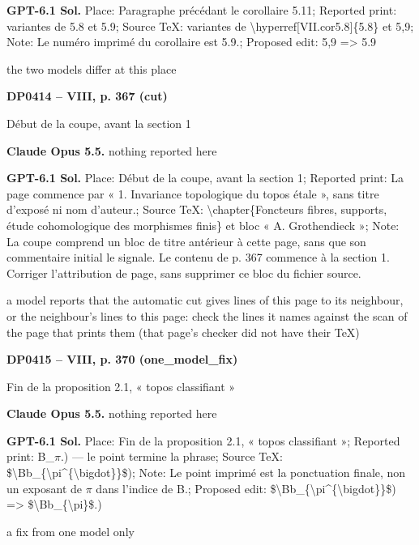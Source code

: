 \textbf{GPT-6.1 Sol.} Place: Paragraphe précédant le corollaire 5.11; Reported print: variantes de 5.8 et 5.9; Source TeX: variantes de \textbackslash{}hyperref[VII.cor5.8]\{5.8\} et 5,9; Note: Le numéro imprimé du corollaire est 5.9.; Proposed edit: 5,9 =\allowbreak > 5.9\par
the two models differ at this place\par
\par\noindent\hypertarget{DP0414}{}\textbf{DP0414 -- VIII, p. 367 (cut)}\par
Début de la coupe, avant la section 1\par
\textbf{Claude Opus 5.5.} nothing reported here\par
\textbf{GPT-6.1 Sol.} Place: Début de la coupe, avant la section 1; Reported print: La page commence par « 1. Invariance topologique du topos étale », sans titre d'exposé ni nom d'auteur.; Source TeX: \textbackslash{}chapter\{Foncteurs fibres, supports, étude cohomologique des morphismes finis\} et bloc « A. Grothendieck »; Note: La coupe comprend un bloc de titre antérieur à cette page, sans que son commentaire initial le signale. Le contenu de p. 367 commence à la section 1. Corriger l'attribution de page, sans supprimer ce bloc du fichier source.\par
a model reports that the automatic cut gives lines of this page to its neighbour, or the neighbour's lines to this page: check the lines it names against the scan of the page that prints them (that page's checker did not have their TeX)\par
\par\noindent\hypertarget{DP0415}{}\textbf{DP0415 -- VIII, p. 370 (one\_model\_fix)}\par
Fin de la proposition 2.1, « topos classifiant »\par
\textbf{Claude Opus 5.5.} nothing reported here\par
\textbf{GPT-6.1 Sol.} Place: Fin de la proposition 2.1, « topos classifiant »; Reported print: B\_\ensuremath{\pi}.) — le point termine la phrase; Source TeX: \$\textbackslash{}Bb\_\{\textbackslash{}pi\textasciicircum{}\{\textbackslash{}bigdot\}\}\$); Note: Le point imprimé est la ponctuation finale, non un exposant de \ensuremath{\pi} dans l'indice de B.; Proposed edit: \$\textbackslash{}Bb\_\{\textbackslash{}pi\textasciicircum{}\{\textbackslash{}bigdot\}\}\$) =\allowbreak > \$\textbackslash{}Bb\_\{\textbackslash{}pi\}\$.)\par
a fix from one model only\par
